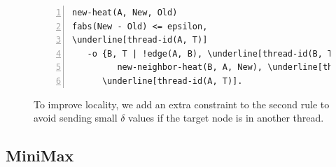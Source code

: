 \begin{figure}[h!]
\begin{Verbatim}[numbers=left,fontsize=\codesize,commandchars=\\\[\]]
new-heat(A, New, Old)
fabs(New - Old) <= epsilon,
\underline[thread-id(A, T)]
   -o {B, T | !edge(A, B), \underline[thread-id(B, T)] |\label[line:coord:ht_better_comp1]
         new-neighbor-heat(B, A, New), \underline[thread-id(B, T)]},\label[line:coord:ht_better_comp2]
      \underline[thread-id(A, T)].
\end{Verbatim}

  \caption{To improve locality, we add an extra constraint to the second rule to
     avoid sending small $\delta$ values if the target node is in another thread.}
  \label{code:coord:ht_better}
\end{figure}

\subsection{MiniMax}

